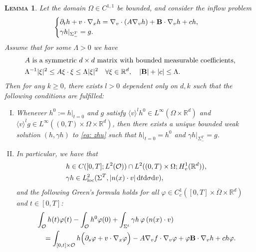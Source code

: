 \documentclass[10pt, reqno]{amsart}
\theoremstyle{plain}
\newtheorem{lemma}[theorem]{\normalfont \scshape Lemma}
\theoremstyle{definition}
\theoremstyle{remark}
\numberwithin{equation}{section}
\newcommand{\bfB}{{\bf B}}
\newcommand{\calO}{\mathcal O}
\newcommand{\p}{\partial}
\newcommand{\R}{\mathbb{R}}
\newcommand{\dv}{\textnormal{d}v}
\newcommand{\dt}{\textnormal{d}t}
\newcommand{\tnd}{\textnormal{d}}
\begin{document}
\begin{lemma}\label{lem: zhu}
    \cite[Theorem 1.1, Corollary 2.9]{Zhu24} Let the domain $\Omega\in C^{1,1}$ be bounded, and consider the inflow problem
    \begin{equation}\label{eq: zhu}
    \begin{cases}
        \p_t h + v\cdot \nabla_x h = \nabla_v\cdot (A \nabla_v h) + \bfB \cdot \nabla_v h + ch,\\
        \gamma h|_{\Sigma_-^T} = g.
    \end{cases}
    \end{equation}
    Assume that for some $\Lambda>0$ we have
    \begin{equation} \label{eq: Ellipticity and Bounds}
    \begin{split}
        &\textnormal{$A$ is a symmetric $d\times d$ matrix with bounded measurable coefficients,}\\
        &\Lambda^{-1} |\xi|^2 \le A\xi\cdot \xi \le \Lambda |\xi|^2 \quad \forall \xi\in \R^d, \quad |\bfB| + |c| \le \Lambda.
    \end{split}
    \end{equation}
    Then for any $k\ge 0$, there exists $l>0$ dependent only on $d,k$ such that the following conditions are fulfilled:
    \begin{enumerate}[(I)]
    \item Whenever $h^0:=h|_{t=0}$ and $g$ satisfy $\langle v \rangle^l h^0 \in L^\infty(\Omega\times\R^d)$ and $\langle v\rangle^l g \in L^\infty((0,T)\times\Omega\times\R^d)$, then there exists a unique bounded weak solution $(h, \gamma h)$ to \eqref{eq: zhu} such that $h|_{t=0} = h^0$ and $\gamma h|_{\Sigma_-^T} = g$.
    \item In particular, we have that
    \begin{align*}
    &h\in C([0,T];L^2(\calO)) \cap L^2((0,T)\times \Omega; H^1_v(\R^d)),\\
    &\gamma h \in L^2_{\rm loc}(\Sigma^T, |n(x)\cdot v|\,\dt\tnd\sigma\dv),
    \end{align*}
    and the following Green's formula holds for all $\varphi\in C_c^1([0,T]\times\overline{\Omega}\times\R^d)$ and $t\in [0,T]$:
    \begin{equation*}
    \begin{split}
        &\int_{\calO} h(t)\varphi(t) - \int_{\calO} h^0 \varphi(0) + \int_{\Sigma^t} \gamma h\, \varphi\, (n(x)\cdot v) \\
        &\quad = \int_{[0,t]\times\calO} h \Big(\p_s\varphi + v\cdot \nabla_x \varphi \Big) - A\nabla_v f\cdot \nabla_v \varphi + \varphi \bfB \cdot \nabla_v h + c h \varphi.

\end{split}
\end{equation*}
\end{enumerate}
\end{lemma}
\end{document}
